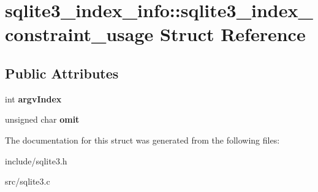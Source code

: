 \hypertarget{structsqlite3__index__info_1_1sqlite3__index__constraint__usage}{\section{sqlite3\-\_\-index\-\_\-info\-:\-:sqlite3\-\_\-index\-\_\-constraint\-\_\-usage Struct Reference}
\label{structsqlite3__index__info_1_1sqlite3__index__constraint__usage}
}
\subsection*{Public Attributes}
\begin{DoxyCompactItemize}
\item 
\hypertarget{structsqlite3__index__info_1_1sqlite3__index__constraint__usage_a2cbf680033c2937b3de226e091743a94}{int {\bfseries argv\-Index}}\label{structsqlite3__index__info_1_1sqlite3__index__constraint__usage_a2cbf680033c2937b3de226e091743a94}

\item 
\hypertarget{structsqlite3__index__info_1_1sqlite3__index__constraint__usage_ad07fa17d30e4fb3abe23ceaf84edf0ef}{unsigned char {\bfseries omit}}\label{structsqlite3__index__info_1_1sqlite3__index__constraint__usage_ad07fa17d30e4fb3abe23ceaf84edf0ef}

\end{DoxyCompactItemize}


The documentation for this struct was generated from the following files\-:\begin{DoxyCompactItemize}
\item 
include/sqlite3.\-h\item 
src/sqlite3.\-c\end{DoxyCompactItemize}

